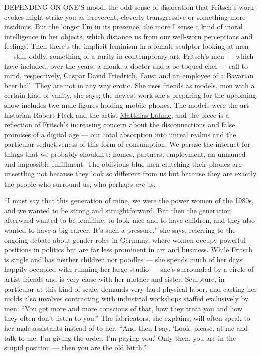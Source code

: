 DEPENDING ON ONE'S mood, the odd sense of dislocation that Fritsch's
work evokes might strike you as irreverent, cleverly transgressive or
something more insidious. But the longer I'm in its presence, the more I
sense a kind of moral intelligence in her objects, which distance us
from our well-worn perceptions and feelings. Then there's the implicit
feminism in a female sculptor looking at men --- still, oddly, something
of a rarity in contemporary art. Fritsch's men --- which have included,
over the years, a monk, a doctor and a be-toqued chef --- call to mind,
respectively, Caspar David Friedrich, Faust and an employee of a
Bavarian beer hall. They are not in any way erotic. She uses friends as
models, men with a certain kind of vanity, she says; the newest work
she's preparing for the upcoming show includes two male figures holding
mobile phones. The models were the art historian Robert Fleck and the
artist \href{http://www.artnet.com/artists/matthias-lahme/}{Matthias
Lahme}, and the piece is a reflection of Fritsch's increasing concern
about the disconnections and false promises of a digital age --- our
total absorption into unreal realms and the particular seductiveness of
this form of consumption. We peruse the internet for things that we
probably shouldn't: homes, partners, employment, an unnamed and
impossible fulfillment. The oblivious blue men clutching their phones
are unsettling not because they look so different from us but because
they are exactly the people who surround us, who perhaps \emph{are} us.

``I must say that this generation of mine, we were the power women of
the 1980s, and we wanted to be strong and straightforward. But then the
generation afterward wanted to be feminine, to look nice and to have
children, and they also wanted to have a big career. It's such a
pressure,'' she says, referring to the ongoing debate about gender roles
in Germany, where women occupy powerful positions in politics but are
far less prominent in art and business. While Fritsch is single and has
neither children nor poodles --- she spends much of her days happily
occupied with running her large studio --- she's surrounded by a circle
of artist friends and is very close with her mother and sister.
Sculpture, in particular at this kind of scale, demands very hard
physical labor, and casting her molds also involves contracting with
industrial workshops staffed exclusively by men: ``You get more and more
conscious of that, how they treat you and how they often don't listen to
you.'' The fabricators, she explains, will often speak to her male
assistants instead of to her. ``And then I say, `Look, please, at me and
talk to me. I'm giving the order, I'm paying you.' Only then, you are in
the stupid position --- then you are the old bitch.''


